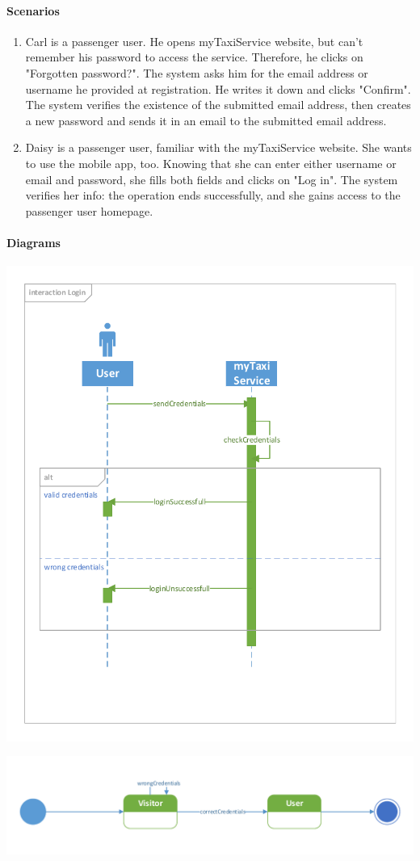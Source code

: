 	\paragraph{Scenarios}
		\begin{enumerate}
			\item Carl is a passenger user. He opens myTaxiService website, but can't remember his password to access the service. Therefore, he clicks on "Forgotten password?". The system asks him for the email address or username he provided at registration. He writes it down and clicks "Confirm". The system verifies the existence of the submitted email address, then creates a new password and sends it in an email to the submitted email address.
			
			\item Daisy is a passenger user, familiar with the myTaxiService website. She wants to use the mobile app, too. Knowing that she can enter either username or email and password, she fills both fields and clicks on "Log in". The system verifies her info: the operation ends successfully, and she gains access to the passenger user homepage.
		\end{enumerate}

	\paragraph{Diagrams}
		\begin{center}
			\includegraphics[height=\textwidth]{diagrams/login}
		\end{center}
		\begin{center}
			\includegraphics[width=\textwidth]{diagrams/login_state}
		\end{center}

